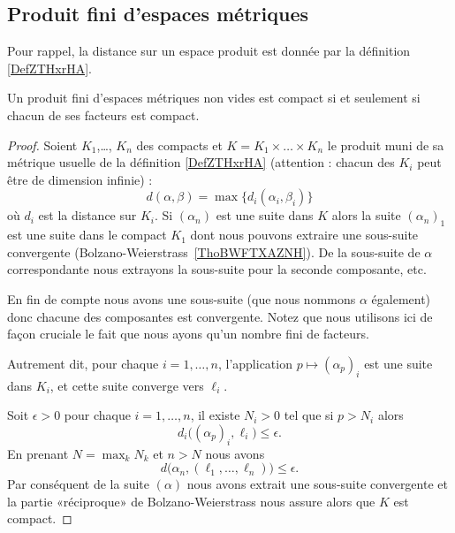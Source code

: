 \subsection{Produit fini d'espaces métriques}

Pour rappel, la distance sur un espace produit est donnée par la définition \ref{DefZTHxrHA}.
\begin{theorem}\label{THOIYmxXuu}
	Un produit fini d'espaces métriques non vides est compact si et seulement si chacun de ses facteurs est compact.
\end{theorem}

\begin{proof}
	Soient \( K_1\),\ldots, \( K_n\) des compacts et \( K=K_1\times \ldots\times K_n\) le produit muni de sa métrique usuelle de la définition \eqref{DefZTHxrHA} (attention : chacun des \( K_i\) peut être de dimension infinie) :
	\begin{equation}
		d(\alpha,\beta)=\max\{ d_i(\alpha_i,\beta_i) \}
	\end{equation}
	où \( d_i\) est la distance sur \( K_i\). Si \( (\alpha_n)\) est une suite dans \( K\) alors la suite \( (\alpha_n)_1\) est une suite dans le compact \( K_1\) dont nous pouvons extraire une sous-suite convergente (Bolzano-Weierstrass~\ref{ThoBWFTXAZNH}). De la sous-suite de \( \alpha\) correspondante nous extrayons la sous-suite pour la seconde composante, etc.

	En fin de compte nous avons une sous-suite (que nous nommons \( \alpha\) également) donc chacune des composantes est convergente. Notez que nous utilisons ici de façon cruciale le fait que nous ayons qu'un nombre fini de facteurs.

	Autrement dit, pour chaque \( i=1,\ldots, n\), l'application \( p\mapsto (\alpha_p)_i\) est une suite dans \( K_i\), et cette suite converge vers \( \ell_i\).

	Soit \( \epsilon>0\) pour chaque \( i=1,\ldots, n\), il existe \( N_i>0\) tel que si \( p>N_i\) alors
	\begin{equation}
		d_i\big( (\alpha_p)_i,\ell_i \big)\leq \epsilon.
	\end{equation}
	En prenant \( N=\max_kN_k\) et \( n>N\) nous avons
	\begin{equation}
		d\big( \alpha_n,(\ell_1,\ldots, \ell_n) \big)\leq\epsilon.
	\end{equation}
	Par conséquent de la suite \( (\alpha)\) nous avons extrait une sous-suite convergente et la partie «réciproque» de Bolzano-Weierstrass nous assure alors que \( K\) est compact.


\end{proof}

